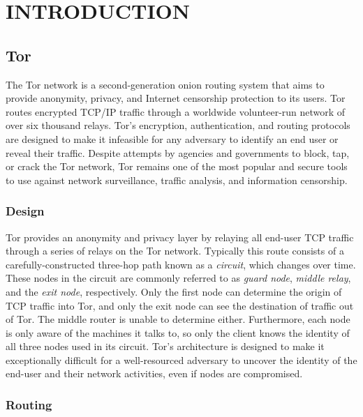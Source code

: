 \chapter{\uppercase{INTRODUCTION}}
\thispagestyle{empty}

\section{Tor}

The Tor network is a second-generation onion routing system that aims to provide anonymity, privacy, and Internet censorship protection to its users. Tor routes encrypted TCP/IP traffic through a worldwide volunteer-run network of over six thousand relays. Tor's encryption, authentication, and routing protocols are designed to make it infeasible for any adversary to identify an end user or reveal their traffic. Despite attempts by agencies and governments to block, tap, or crack the Tor network, Tor remains one of the most popular and secure tools to use against network surveillance, traffic analysis, and information censorship.

\subsection{Design}

Tor provides an anonymity and privacy layer by relaying all end-user TCP traffic through a series of relays on the Tor network. Typically this route consists of a carefully-constructed three-hop path known as a \textit{circuit}, which changes over time. These nodes in the circuit are commonly referred to as \textit{guard node}, \textit{middle relay}, and the \textit{exit node}, respectively. Only the first node can determine the origin of TCP traffic into Tor, and only the exit node can see the destination of traffic out of Tor. The middle router is unable to determine either. Furthermore, each node is only aware of the machines it talks to, so only the client knows the identity of all three nodes used in its circuit. Tor's architecture is designed to make it exceptionally difficult for a well-resourced adversary to uncover the identity of the end-user and their network activities, even if nodes are compromised.\cite{McCoy2008}

\subsection{Routing}

